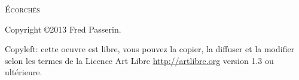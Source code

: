 
\textsc{Écorchés}

\vspace{\baselineskip}

Copyright \copyright 2013 Fred Passerin.

\vspace{\baselineskip}

\vspace{\baselineskip}
Copyleft: cette oeuvre est libre, vous pouvez la copier, la diffuser et la 
modifier selon les termes de la Licence Art Libre
\url{http://artlibre.org} version 1.3 ou ultérieure.